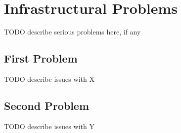 \chapter{Infrastructural Problems}\label{ch:problems}
TODO describe serious problems here, if any

\section{First Problem}
TODO describe issues with X

\section{Second Problem}
TODO describe issues with Y
